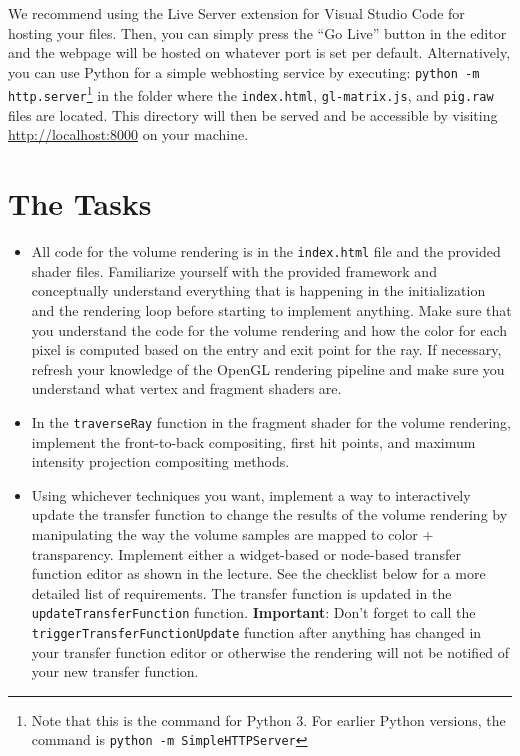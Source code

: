 \documentclass{labinstructions}
\begin{document}
We recommend using the Live Server extension for Visual Studio Code for hosting your files. Then, you can simply press the  ``Go Live'' button in the editor and the webpage will be hosted on whatever port is set per default.
Alternatively, you can use Python for a simple webhosting service by executing: \texttt{python -m http.server}\footnote{Note that this is the command for Python 3. For earlier Python versions, the command is \texttt{python -m SimpleHTTPServer}} in the folder where the \texttt{index.html}, \texttt{gl-matrix.js}, and \texttt{pig.raw} files are located.  This directory will then be served and be accessible by visiting \href{http://localhost:8000}{http://localhost:8000} on your machine.


\section{The Tasks}
\begin{itemize}
  \item All code for the volume rendering is in the \texttt{index.html} file and the provided shader files. Familiarize yourself with the provided framework and conceptually understand everything that is happening in the initialization and the rendering loop before starting to implement anything. Make sure that you understand the code for the volume rendering and how the color for each pixel is computed based on the entry and exit point for the ray. If necessary, refresh your knowledge of the OpenGL rendering pipeline and make sure you understand what vertex and fragment shaders are.
  \item In the \texttt{traverseRay} function in the fragment shader for the volume rendering, implement the front-to-back compositing, first hit points, and maximum intensity projection compositing methods.
  \item Using whichever techniques you want, implement a way to interactively update the transfer function to change the results of the volume rendering by manipulating the way the volume samples are mapped to color + transparency.  Implement either a widget-based or node-based transfer function editor as shown in the lecture.  See the checklist below for a more detailed list of requirements.  The transfer function is updated in the \texttt{updateTransferFunction} function.  \textbf{Important}:  Don't forget to call the \texttt{triggerTransferFunctionUpdate} function after anything has changed in your transfer function editor or otherwise the rendering will not be notified of your new transfer function.
\end{itemize}
\end{document}
